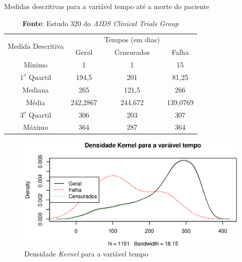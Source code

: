 \documentclass[
	12pt,				%
	openright,			%
	twoside,			%
	a4paper,			%
	english,			%
	brazil				%
	]{abntex2}
\begin{document}
\begin{table}[!ht]
	\caption{Medidas descritivas para a variável tempo até a morte do paciente}
    \label{tab:exp1}
    \centering
	\begin{tabular}{cccc}
    	\hline
		\multirow{2}{*}{Medida Descritiva} & \ &  Tempos (em dias) \\
        \ & Geral & Censurados & Falha \\\hline
        Mínimo & 1 & 1 & 15 \\
        $1^o$ Quartil & 194,5 & 201 & 81,25 \\
        Mediana & 265 & 121,5 & 266 \\
        Média & 242,2867 & 244,672 & 139,0769 \\
        $3^o$ Quartil & 306 & 203 & 307 \\
        Máximo & 364 & 287 & 364 \\\hline\hline
	\end{tabular}
    \caption*{\tiny{\textbf{Fonte}: Estudo 320 do \textit{AIDS Clinical Trials Group}}}
\end{table}

\begin{figure}[!ht]
	\centering
    \caption{Densidade \textit{Kernel} para a variável tempo}
    \label{fig:exp1}
	\includegraphics[scale = 0.9]{Rplot}
\end{figure}
\end{document}
